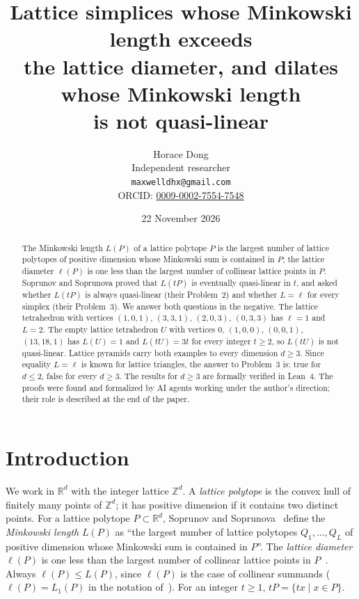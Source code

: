 \documentclass[11pt]{article}
\title{Lattice simplices whose Minkowski length exceeds\\ the lattice diameter, and
dilates whose Minkowski length\\ is not quasi-linear}
\author{Horace Dong\\ \small Independent researcher\\
\small\texttt{maxwelldhx@gmail.com}\\
\small ORCID: \href{https://orcid.org/0009-0002-7554-7548}{0009-0002-7554-7548}}
\date{22 November 2026}
\theoremstyle{definition}
\theoremstyle{remark}
\newcommand{\Z}{\mathbb Z}
\newcommand{\R}{\mathbb R}
\begin{document}
\maketitle

\begin{abstract}
The Minkowski length $L(P)$ of a lattice polytope $P$ is the largest number of
lattice polytopes of positive dimension whose Minkowski sum is contained in
$P$; the lattice diameter $\ell(P)$ is one less than the largest number of
collinear lattice points in $P$. Soprunov and Soprunova proved that
$L(tP)$ is eventually quasi-linear in $t$, and asked whether $L(tP)$ is always
quasi-linear (their Problem~2) and whether $L=\ell$ for every simplex
(their Problem~3). We answer both questions in the negative. The lattice
tetrahedron with vertices $(1,0,1)$, $(3,3,1)$, $(2,0,3)$, $(0,3,3)$ has
$\ell=1$ and $L=2$. The empty lattice tetrahedron $U$ with vertices $0$,
$(1,0,0)$, $(0,0,1)$, $(13,18,1)$ has $L(U)=1$ and $L(tU)=3t$ for every
integer $t\ge2$, so $L(tU)$ is not quasi-linear. Lattice pyramids carry both
examples to every dimension $d\ge3$. Since equality $L=\ell$ is known for
lattice triangles, the answer to Problem~3 is: true for $d\le2$, false for
every $d\ge3$. The results for $d\ge3$ are formally verified in Lean~4. The
proofs were found and formalized by AI agents working under the author's
direction; their role is described at the end of the paper.
\end{abstract}

\section{Introduction}

We work in $\R^d$ with the integer lattice $\Z^d$. A \emph{lattice polytope}
is the convex hull of finitely many points of $\Z^d$; it has positive
dimension if it contains two distinct points. For a lattice polytope
$P\subset\R^d$, Soprunov and Soprunova~\cite[Definition~1.1]{ss} define the
\emph{Minkowski length} $L(P)$ as ``the largest number of lattice polytopes
$Q_1,\dots,Q_L$ of positive dimension whose Minkowski sum is contained in
$P$''. The \emph{lattice diameter} $\ell(P)$ is one less than the largest
number of collinear lattice points in $P$~\cite[Introduction and p.~5]{ss}.
Always $\ell(P)\le L(P)$, since $\ell(P)$ is the case of collinear summands
($\ell(P)=L_1(P)$ in the notation of~\cite[Definition~2.5]{ss}). For an
integer $t\ge1$, $tP=\{tx\mid x\in P\}$.
\end{document}
